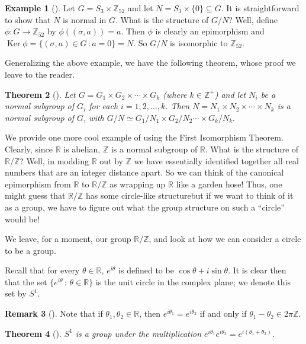 \documentclass[10pt,]{book}
\theoremstyle{plain}
\newtheorem{theorem}{Theorem}[section]
\theoremstyle{definition}
\theoremstyle{definition}
\newtheorem{remark}[theorem]{Remark}
\theoremstyle{definition}
\newtheorem{example}[theorem]{Example}
\theoremstyle{definition}
\numberwithin{equation}{section}
\def\Z{\mathbb{Z}}
\def\R{\mathbb{R}}
\DeclareMathOperator{\Ker}{Ker}
\begin{document}
\begin{example}[]\label{example-87}
Let \(G=S_3\times \Z_{52}\) and let \(N=S_3 \times
\{0\}\subseteq G\). It is straightforward to show that \(N\) is normal in \(G\). What is the structure of \(G/N\)? Well, define \(\phi:G\to
\Z_{52}\) by \(\phi((\sigma, a))=a\). Then \(\phi\) is clearly an epimorphism and \(\Ker \phi=\{(\sigma,a)\in G\,:a=0\}=N\). So \(G/N\) is isomorphic to \(\Z_{52}\).%
\end{example}
Generalizing the above example, we have the following theorem, whose proof we leave to the reader.%
\begin{theorem}[{}]\label{theorem-64}
Let \(G=G_1\times G_2 \times \cdots \times G_k\) (where \(k\in \Z^+\)) and let \(N_i\) be a normal subgroup of \(G_i\) for each \(i=1,2,\ldots, k\). Then \(N=N_1 \times N_2 \times \cdots \times N_k\) is a normal subgroup of \(G\), with \(G/N \simeq G_1/N_1 \times G_2/N_2
\cdots \times G_k/N_k.\)%
\end{theorem}
We provide one more cool example of using the First Isomorphism Theorem. Clearly, since \(\R\) is abelian, \(\Z\) is a normal subgroup of \(\R\). What is the structure of \(\R/\Z\)? Well, in modding \(\R\) out by \(\Z\) we have essentially identified together all real numbers that are an integer distance apart. So we can think of the canonical epimorphism from \(\R\) to \(\R/\Z\) as wrapping up \(\R\) like a garden hose! Thus, one might guess that \(\R/\Z\) has some circle-like structure\textemdash{}but if we want to think of it as a group, we have to figure out what the group structure on such a ``circle'' would be!%
\par
We leave, for a moment, our group \(\R/\Z\), and look at how we can consider a circle to be a group.%
\par
Recall that for every \(\theta \in \R\), \(e^{i\theta}\) is defined to be \(\cos \theta + i\sin \theta\). It is clear then that the set \(\{e^{i\theta} \,:\, \theta\in
\R\}\) is the unit circle in the complex plane; we denote this set by \(S^1\).%
\label{notation-29}
\begin{remark}[]\label{remark-40}
Note that if \(\theta_1, \theta_2\in \R\), then \(e^{i\theta_1}=e^{i\theta_2}\) if and only if \(\theta_1-\theta_2
\in 2\pi \Z\).%
\end{remark}
\begin{theorem}[{}]\label{theorem-65}
\(S^1\) is a group under the multiplication \(e^{i\theta_1}e^{i\theta_2}=e^{i(\theta_1+\theta_2)}\).%
\end{theorem}
\end{document}
